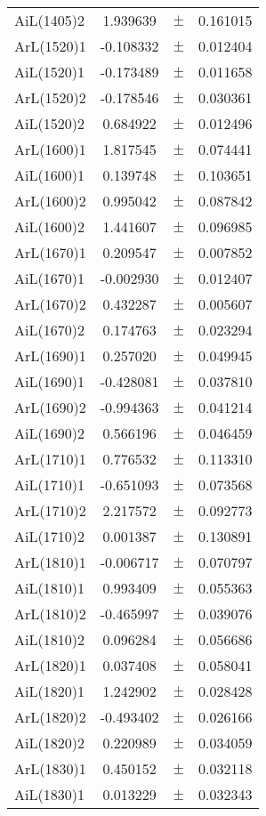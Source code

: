 \begin{table}
\begin{tiny}
\begin{tabular}{lccc}
AiL(1405)2 & 1.939639 & $\pm$ & 0.161015 \\
ArL(1520)1 & -0.108332 & $\pm$ & 0.012404 \\
AiL(1520)1 & -0.173489 & $\pm$ & 0.011658 \\
ArL(1520)2 & -0.178546 & $\pm$ & 0.030361 \\
AiL(1520)2 & 0.684922 & $\pm$ & 0.012496 \\
ArL(1600)1 & 1.817545 & $\pm$ & 0.074441 \\
AiL(1600)1 & 0.139748 & $\pm$ & 0.103651 \\
ArL(1600)2 & 0.995042 & $\pm$ & 0.087842 \\
AiL(1600)2 & 1.441607 & $\pm$ & 0.096985 \\
ArL(1670)1 & 0.209547 & $\pm$ & 0.007852 \\
AiL(1670)1 & -0.002930 & $\pm$ & 0.012407 \\
ArL(1670)2 & 0.432287 & $\pm$ & 0.005607 \\
AiL(1670)2 & 0.174763 & $\pm$ & 0.023294 \\
ArL(1690)1 & 0.257020 & $\pm$ & 0.049945 \\
AiL(1690)1 & -0.428081 & $\pm$ & 0.037810 \\
ArL(1690)2 & -0.994363 & $\pm$ & 0.041214 \\
AiL(1690)2 & 0.566196 & $\pm$ & 0.046459 \\
ArL(1710)1 & 0.776532 & $\pm$ & 0.113310 \\
AiL(1710)1 & -0.651093 & $\pm$ & 0.073568 \\
ArL(1710)2 & 2.217572 & $\pm$ & 0.092773 \\
AiL(1710)2 & 0.001387 & $\pm$ & 0.130891 \\
ArL(1810)1 & -0.006717 & $\pm$ & 0.070797 \\
AiL(1810)1 & 0.993409 & $\pm$ & 0.055363 \\
ArL(1810)2 & -0.465997 & $\pm$ & 0.039076 \\
AiL(1810)2 & 0.096284 & $\pm$ & 0.056686 \\
ArL(1820)1 & 0.037408 & $\pm$ & 0.058041 \\
AiL(1820)1 & 1.242902 & $\pm$ & 0.028428 \\
ArL(1820)2 & -0.493402 & $\pm$ & 0.026166 \\
AiL(1820)2 & 0.220989 & $\pm$ & 0.034059 \\
ArL(1830)1 & 0.450152 & $\pm$ & 0.032118 \\
AiL(1830)1 & 0.013229 & $\pm$ & 0.032343 \\

\end{tabular}
\end{tiny}
\end{table}
